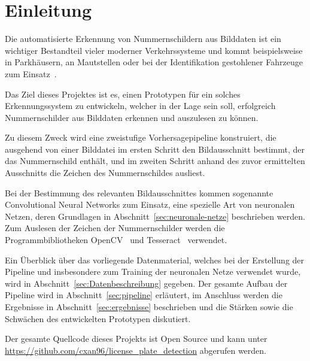 \section{Einleitung}

Die automatisierte Erkennung von Nummernschildern aus Bilddaten
ist ein wichtiger Bestandteil vieler moderner Verkehrssysteme
und kommt beispielsweise in Parkh\"ausern, an Mautstellen
oder bei der Identifikation gestohlener Fahrzeuge zum
Einsatz~\cite{silva2018a}.

Das Ziel dieses Projektes ist es, einen Prototypen f\"ur ein solches
Erkennungssystem zu entwickeln, welcher in der
Lage sein soll, erfolgreich Nummernschilder aus Bilddaten erkennen
und auszulesen zu k\"onnen.

Zu diesem Zweck wird eine zweistufige Vorhersagepipeline konstruiert,
die ausgehend von einer Bilddatei im ersten Schritt den Bildausschnitt
bestimmt, der das Nummernschild enth\"alt, und im zweiten Schritt anhand
des zuvor ermittelten
Ausschnitts die Zeichen des Nummernschildes ausliest.

Bei der Bestimmung des relevanten Bildausschnittes kommen sogenannte
Convolutional Neural Networks zum Einsatz, eine spezielle Art von
neuronalen Netzen, deren Grundlagen in Abschnitt~\ref{sec:neuronale-netze}
beschrieben werden. Zum Auslesen der Zeichen der Nummernschilder werden die
Programmbibliotheken OpenCV~\cite{opencv_library} und
Tesseract~\cite{tesseract} verwendet.

Ein \"Uberblick \"uber das vorliegende Datenmaterial, welches
bei der Erstellung der Pipeline und insbesondere zum Training der
neuronalen Netze verwendet wurde, wird in
Abschnitt~\ref{sec:Datenbeschreibung} gegeben.
Der gesamte Aufbau der Pipeline wird in Abschnitt~\ref{sec:pipeline}
erl\"autert, im Anschluss werden die Ergebnisse in Abschnitt~\ref{sec:ergebnisse}
beschrieben und die St\"arken sowie die Schw\"achen des entwickelten
Prototypen diskutiert.

Der gesamte Quellcode dieses Projekts ist Open Source und kann
unter \url{https://github.com/cxan96/license_plate_detection}
abgerufen werden.
